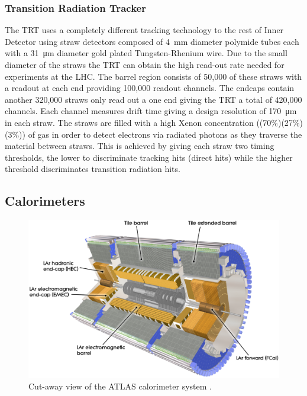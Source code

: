 		\subsubsection*{Transition Radiation Tracker}

		The TRT uses a completely different tracking technology to the rest of Inner Detector using straw detectors composed of 4~mm diameter polymide tubes each with a \SI{31}{\um} diameter gold plated Tungsten-Rhenium wire. Due to the small diameter of the straws the TRT can obtain the high read-out rate needed for experiments at the LHC. The barrel region consists of 50,000 of these straws with a readout at each end providing 100,000 readout channels. The endcaps contain another 320,000 straws only read out a one end giving the TRT a total of 420,000 channels. Each channel measures drift time giving a design resolution of \SI{170}{\um} in each straw. The straws are filled with a high Xenon concentration ((70\%)(27\%)(3\%)) of gas in order to detect electrons via radiated photons as they traverse the material between straws. This is achieved by giving each straw two timing thresholds, the lower to discriminate tracking hits (direct hits) while the higher threshold discriminates transition radiation hits.  %
		



	\subsection{Calorimeters}

		\begin{figure}[h!]
			\begin{center}
				\includegraphics[width=0.95\linewidth]{images/Calorimeter_d3.eps}
			\end{center}
			\caption{Cut-away view of the ATLAS calorimeter system \cite{Aad:1129811}.}
			\label{fig:ATLAS_calo}
		\end{figure}

